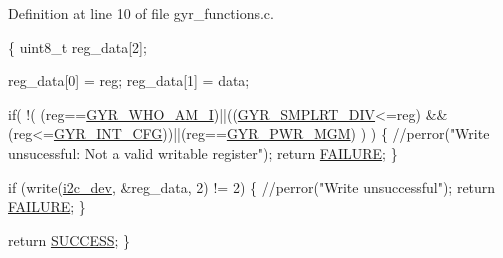 Definition at line 10 of file gyr\-\_\-functions.\-c.


\begin{DoxyCode}
\{
  uint8\_t reg\_data[2];

  reg\_data[0] = reg;
  reg\_data[1] = data;

  \textcolor{keywordflow}{if}( !( (reg==\hyperlink{communication_2imu__regs_8h_ab2499ff4167376accdbdec09f5e1b021}{GYR\_WHO\_AM\_I})||((\hyperlink{communication_2imu__regs_8h_a04a18568e6e39825c98be5ec2976bec4}{GYR\_SMPLRT\_DIV}<=reg)
      &&(reg<=\hyperlink{communication_2imu__regs_8h_ad0b8386ab023e17beb305025abf96e18}{GYR\_INT\_CFG}))||(reg==\hyperlink{communication_2imu__regs_8h_a5eba4af610a1ec85320e940bf44855eb}{GYR\_PWR\_MGM}) ) )
  \{
      \textcolor{comment}{//perror("Write unsucessful: Not a valid writable register");}
      \textcolor{keywordflow}{return} \hyperlink{calibration_2calibration_8h_a6d58f9ac447476b4e084d7ca383f5183}{FAILURE};
  \}
        
  \textcolor{keywordflow}{if} (write(\hyperlink{CommunicationV0_2communication_8c_a7751bd45ac1064efb35adf1f19c25db8}{i2c\_dev}, &reg\_data, 2) != 2) \{                
          \textcolor{comment}{//perror("Write unsuccessful");}
          \textcolor{keywordflow}{return} \hyperlink{calibration_2calibration_8h_a6d58f9ac447476b4e084d7ca383f5183}{FAILURE};
  \}

  \textcolor{keywordflow}{return} \hyperlink{calibration_2calibration_8h_aa90cac659d18e8ef6294c7ae337f6b58}{SUCCESS};
\}
\end{DoxyCode}
